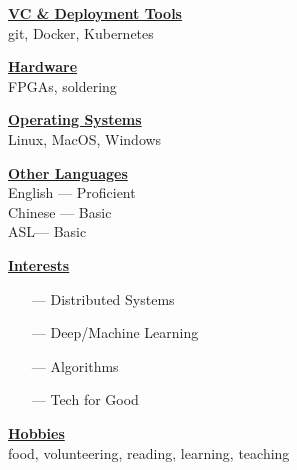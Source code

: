 \documentclass{WeiAndrew}
\def\defaultsectionspacingsize{11px}
\begin{document}
{\begin{minipage}[t][\textheight-2\fboxsep-2\fboxrule][c]{0.25\textwidth}
        \textbf{\underline{VC \& Deployment Tools}} \\
        git, Docker, Kubernetes
        \vspace{\defaultsectionspacingsize}

        \textbf{\underline{Hardware}} \\
        FPGAs, soldering
        \vspace{\defaultsectionspacingsize}

        \textbf{\underline{Operating Systems}} \\
        Linux, MacOS, Windows
        \vspace{\defaultsectionspacingsize}

        \textbf{\underline{Other Languages}} \\
        English --- Proficient \\
        Chinese --- Basic      \\
        ASL\nobreakspace\nobreakspace\nobreakspace\nobreakspace\nobreakspace --- Basic      \\
        \vspace{\defaultsectionspacingsize}

        \textbf{\underline{Interests}} \\
        \begin{itemize}[leftmargin=4mm]
            \item[---] Distributed Systems
            \item[---] Deep/Machine Learning
            \item[---] Algorithms
            \item[---] Tech for Good
        \end{itemize}
        \vspace{\defaultsectionspacingsize}

        \textbf{\underline{Hobbies}} \\
        food, volunteering, reading, learning, teaching
    \end{minipage}%
    \hspace{0.01\textwidth}
}%
\end{document}
